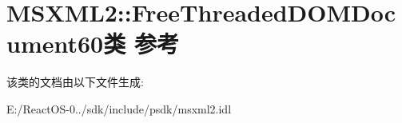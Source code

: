 \hypertarget{class_m_s_x_m_l2_1_1_free_threaded_d_o_m_document60}{}\section{M\+S\+X\+M\+L2\+:\+:Free\+Threaded\+D\+O\+M\+Document60类 参考}
\label{class_m_s_x_m_l2_1_1_free_threaded_d_o_m_document60}


该类的文档由以下文件生成\+:\begin{DoxyCompactItemize}
\item 
E\+:/\+React\+O\+S-\/0../sdk/include/psdk/msxml2.\+idl\end{DoxyCompactItemize}
